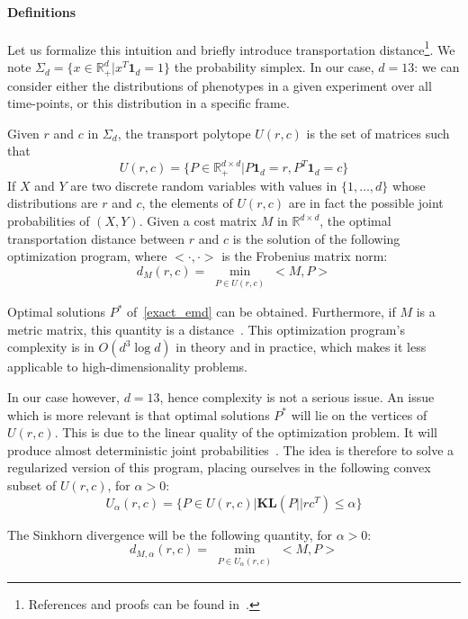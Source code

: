 \paragraph*{Definitions}
Let us formalize this intuition and briefly introduce transportation distance\footnote{References and proofs can be found in~\cite{sinkhorn}.}. We note $\Sigma_d = \{ x \in \mathbb{R}^d_+ | x^T \mathbf{1}_d = 1\}$ the probability simplex. In our case, $d=13$: we can consider either the distributions of phenotypes in a given experiment over all time-points, or this distribution in a specific frame.

Given $r$ and $c$ in $\Sigma_d$, the transport polytope $U(r,c)$ is the set of matrices such that 
\[
U(r,c)=\{ P\in \mathbb{R}^{d\times d}_+ | P\mathbf{1}_d = r, P^T \mathbf{1}_d = c \}\] 
If $X$ and $Y$ are two discrete random variables with values in $ \{1,\ldots , d\} $ whose distributions are $r$ and $c$, the elements of $U(r,c)$ are in fact the possible joint probabilities of $\left( X,Y\right)$. Given a cost matrix $M$ in $\mathbb{R}^{d\times d}$, the optimal transportation distance between $r$ and $c$ is the solution of the following optimization program, where $<\cdot, \cdot> $ is the Frobenius matrix norm:
\begin{equation}
d_M(r,c) = \min_{\substack{P\in U(r,c)}} <M,P>
\label{exact_emd}
\end{equation}

Optimal solutions $P^*$ of~\ref{exact_emd} can be obtained. Furthermore, if $M$ is a metric matrix, this quantity is a distance~\cite{Villani}. This optimization program's complexity is in $O\left( d^3\log d\right) $ in theory and in practice, which makes it less applicable to high-dimensionality problems. 

In our case however, $d=13$, hence complexity is not a serious issue. An issue which is more relevant is that optimal solutions $P^*$ will lie on the vertices of $U(r,c)$. This is due to the linear quality of the optimization problem. It will produce almost deterministic joint probabilities~\cite{sinkhorn}. The idea is therefore to solve a regularized version of this program, placing ourselves in the following convex subset of $U(r,c)$, for $\alpha >0$:
\[
U_\alpha\left( r, c\right) = \{ P \in U\left( r,c \right) | \mathbf{KL}\left(P || rc^T\right)\leqslant \alpha\}
\]

The Sinkhorn divergence will be the following quantity, for $\alpha >0$:
\begin{equation}
d_{M, \alpha}(r,c) = \min_{\substack{P\in U_\alpha (r,c)}} <M,P>
\label{emd}
\end{equation}

